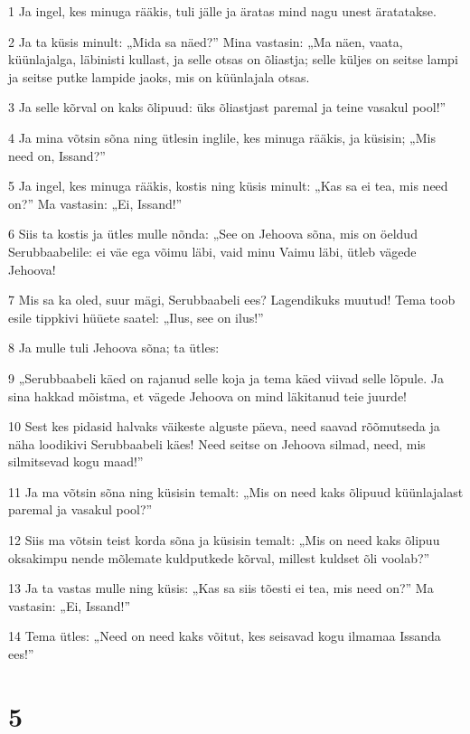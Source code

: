 \par 1 Ja ingel, kes minuga rääkis, tuli jälle ja äratas mind nagu unest äratatakse.
\par 2 Ja ta küsis minult: „Mida sa näed?” Mina vastasin: „Ma näen, vaata, küünlajalga, läbinisti kullast, ja selle otsas on õliastja; selle küljes on seitse lampi ja seitse putke lampide jaoks, mis on küünlajala otsas.
\par 3 Ja selle kõrval on kaks õlipuud: üks õliastjast paremal ja teine vasakul pool!”
\par 4 Ja mina võtsin sõna ning ütlesin inglile, kes minuga rääkis, ja küsisin; „Mis need on, Issand?”
\par 5 Ja ingel, kes minuga rääkis, kostis ning küsis minult: „Kas sa ei tea, mis need on?” Ma vastasin: „Ei, Issand!”
\par 6 Siis ta kostis ja ütles mulle nõnda: „See on Jehoova sõna, mis on öeldud Serubbaabelile: ei väe ega võimu läbi, vaid minu Vaimu läbi, ütleb vägede Jehoova!
\par 7 Mis sa ka oled, suur mägi, Serubbaabeli ees? Lagendikuks muutud! Tema toob esile tippkivi hüüete saatel: „Ilus, see on ilus!”
\par 8 Ja mulle tuli Jehoova sõna; ta ütles:
\par 9 „Serubbaabeli käed on rajanud selle koja ja tema käed viivad selle lõpule. Ja sina hakkad mõistma, et vägede Jehoova on mind läkitanud teie juurde!
\par 10 Sest kes pidasid halvaks väikeste alguste päeva, need saavad rõõmutseda ja näha loodikivi Serubbaabeli käes! Need seitse on Jehoova silmad, need, mis silmitsevad kogu maad!”
\par 11 Ja ma võtsin sõna ning küsisin temalt: „Mis on need kaks õlipuud küünlajalast paremal ja vasakul pool?”
\par 12 Siis ma võtsin teist korda sõna ja küsisin temalt: „Mis on need kaks õlipuu oksakimpu nende mõlemate kuldputkede kõrval, millest kuldset õli voolab?”
\par 13 Ja ta vastas mulle ning küsis: „Kas sa siis tõesti ei tea, mis need on?” Ma vastasin: „Ei, Issand!”
\par 14 Tema ütles: „Need on need kaks võitut, kes seisavad kogu ilmamaa Issanda ees!”


\chapter{5}

